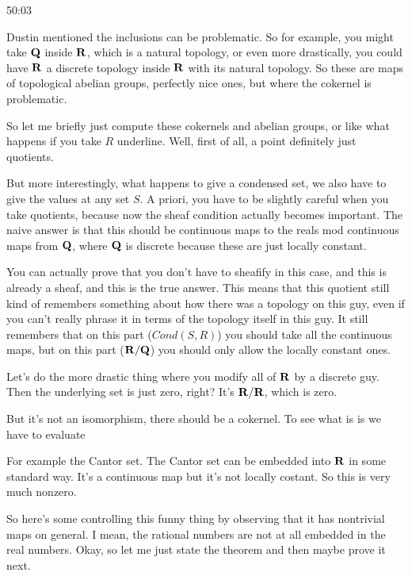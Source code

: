 \begin{unfinished}{50:03}
\begin{remark}
\begin{example}


Dustin mentioned the inclusions can be problematic. So for example, you might take $\mathbf Q$ inside $\mathbf R$, which is a natural topology, or even more drastically, you could have $\mathbf R$ a discrete topology inside $\mathbf R$ with its natural topology. So these are maps of topological abelian groups, perfectly nice ones, but where the cokernel is problematic.

So let me briefly just compute these cokernels and abelian groups, 
or like what happens if you take $R$ underline. Well, first of all, a point definitely just quotients.

But more interestingly, what happens to give a condensed set, we also have to give the values at any set $S$. A priori, you have to be slightly careful when you take quotients, because now the sheaf condition actually becomes important. The naive answer is that this should be continuous maps to the reals mod continuous maps from $\mathbf Q$, where $\mathbf Q$ is discrete because these are just locally constant.

You can actually prove that you don't have to sheafify in this case, and this is already a sheaf, and this is the true answer. This means that this quotient still kind of remembers something about how there was a topology on this guy, even if you can't really phrase it in terms of the topology itself in this guy. It still remembers that on this part ($Cond(S,R)$) you should take all the continuous maps, but on this part ($\mathbf R/\mathbf Q$) you should only allow the locally constant ones.

Let's do the more drastic thing where you modify all of $\mathbf R$ by a discrete guy. Then the underlying set is just zero, right? It's $\mathbf R/\mathbf R$, which is zero.


But it's not an isomorphism, there should be a cokernel. To see what is is we have to evaluate


For example the Cantor set. The Cantor set can be embedded into $\mathbf R$ in some standard way. It's a continuous map but it's not locally costant. So this is very much nonzero.

So here's some controlling this funny thing by observing that it has nontrivial maps on general. I mean, the rational numbers are not at all embedded in the real numbers. Okay, so let me just state the theorem and then maybe prove it next.


\end{example}
\end{remark}
\end{unfinished}
